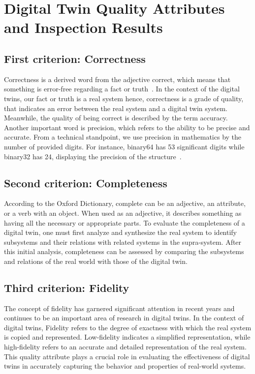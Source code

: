\documentclass{llncs}
\begin{document}
    \section{Digital Twin Quality Attributes and Inspection Results}
    

    \subsection{First criterion: Correctness}
    Correctness is a  derived word from the adjective correct, which means that something is error-free regarding a fact or truth~\cite{OxfordDictionary}. 
    In the context of the digital twins, our fact or truth is a real system hence, correctness is a grade of quality, that indicates an error between the real system and a digital twin system.
    Meanwhile, the quality of being correct is described by the term accuracy. Another important word is precision, 
    which refers to the ability to be precise and accurate\cite{OxfordDictionary}. 
    From a technical standpoint, we use precision in mathematics by the number of provided digits. 
    For instance, binary64 has 53 significant digits while binary32 has 24, displaying the precision of the structure~\cite{IEE754}.  
    
    \subsection{Second criterion: Completeness}
    According to the Oxford Dictionary, complete can be an adjective, an attribute, or  a verb with an object\cite{OxfordDictionary}. When used as an adjective, it describes something 
    as having all the necessary or appropriate parts. To evaluate the completeness of a digital twin, 
    one must first analyze and synthesize the real system to identify subsystems and their relations with related systems in the supra-system. 
    After this initial analysis, completeness can be assessed by comparing the subsystems and relations of the real world with those of the digital twin.


    \subsection{Third criterion: Fidelity}
    The concept of fidelity has garnered significant attention in recent years and continues to be an important area of research in digital twins.
    In the context of digital twins, Fidelity refers to the degree of exactness with which the real system is copied and represented.
    Low-fidelity indicates a simplified representation, while high-fidelity refers to an accurate and detailed representation of the real system.
    This quality attribute plays a crucial role in evaluating the effectiveness of digital twins in accurately capturing the behavior and properties of real-world systems. 
\end{document}
